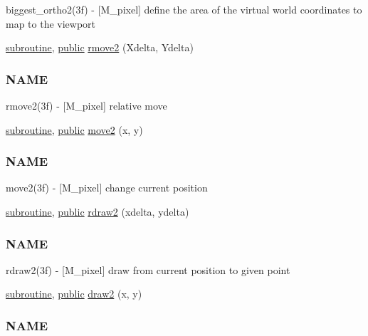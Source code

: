 \begin{DoxyCompactItemize}
\begin{DoxyCompactList}
biggest\+\_\+ortho2(3f) -\/ \mbox{[}M\+\_\+pixel\mbox{]} define the area of the virtual world coordinates to map to the viewport \end{DoxyCompactList}\item 
\hyperlink{M__stopwatch_83_8txt_acfbcff50169d691ff02d4a123ed70482}{subroutine}, \hyperlink{M__stopwatch_83_8txt_a2f74811300c361e53b430611a7d1769f}{public} \hyperlink{namespacem__pixel_a9b0fb9ccafe605fd6daf50c74347ed3a}{rmove2} (Xdelta, Ydelta)
\begin{DoxyCompactList}\small\item\em \subsubsection*{N\+A\+ME}

rmove2(3f) -\/ \mbox{[}M\+\_\+pixel\mbox{]} relative move \end{DoxyCompactList}\item 
\hyperlink{M__stopwatch_83_8txt_acfbcff50169d691ff02d4a123ed70482}{subroutine}, \hyperlink{M__stopwatch_83_8txt_a2f74811300c361e53b430611a7d1769f}{public} \hyperlink{namespacem__pixel_ab5d4dc474ff84dc0f3f35f4a395979e0}{move2} (x, y)
\begin{DoxyCompactList}\small\item\em \subsubsection*{N\+A\+ME}

move2(3f) -\/ \mbox{[}M\+\_\+pixel\mbox{]} change current position \end{DoxyCompactList}\item 
\hyperlink{M__stopwatch_83_8txt_acfbcff50169d691ff02d4a123ed70482}{subroutine}, \hyperlink{M__stopwatch_83_8txt_a2f74811300c361e53b430611a7d1769f}{public} \hyperlink{namespacem__pixel_a664375b036092dbebe1bccdc67254e1d}{rdraw2} (xdelta, ydelta)
\begin{DoxyCompactList}\small\item\em \subsubsection*{N\+A\+ME}

rdraw2(3f) -\/ \mbox{[}M\+\_\+pixel\mbox{]} draw from current position to given point \end{DoxyCompactList}\item 
\hyperlink{M__stopwatch_83_8txt_acfbcff50169d691ff02d4a123ed70482}{subroutine}, \hyperlink{M__stopwatch_83_8txt_a2f74811300c361e53b430611a7d1769f}{public} \hyperlink{namespacem__pixel_a12012e819bb14b27d2b49732aa2e4e55}{draw2} (x, y)
\begin{DoxyCompactList}\small\item\em \subsubsection*{N\+A\+ME}


\end{DoxyCompactList}
\end{DoxyCompactItemize}
